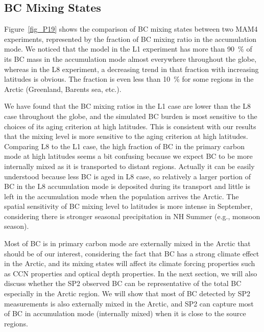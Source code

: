 \documentclass[12pt]{article}
\begin{document}
	\subsection{BC Mixing States}
	 Figure~\ref{fig_P19} shows the comparison of BC mixing states between two MAM4 experiments, represented by the fraction of BC mixing ratio in the accumulation mode. We noticed that the model in the L1 experiment has more than 90~$\%$ of its BC mass in the accumulation mode almost everywhere throughout the globe, whereas in the L8 experiment, a decreasing trend in that fraction with increasing latitudes is obvious. The fraction is even less than 10~$\%$ for some regions in the Arctic (Greenland, Barents sea, etc.). 
	 
	 We have found that the BC mixing ratios in the L1 case are lower than the L8 case throughout the globe, and the simulated BC burden is most sensitive to the choices of its aging criterion at high latitudes. This is consistent with our results that the mixing level is more sensitive to the aging criterion at high latitudes. Comparing L8 to the L1 case, the high fraction of BC in the primary carbon mode at high latitudes seems a bit confusing because we expect BC to be more internally mixed as it is transported to distant regions. Actually it can be easily understood because less BC is aged in L8 case, so relatively a larger portion of BC in the L8 accumulation mode is deposited during its transport and little is left in the accumulation mode when the population arrives the Arctic. The spatial sensitivity of BC mixing level to latitudes is more intense in September, considering there is stronger seasonal precipitation in NH Summer (e.g., monsoon season). 
	 
	 Most of BC is in primary carbon mode are externally mixed in the Arctic that should be of our interest, considering the fact that BC has a strong climate effect in the Arctic, and its mixing states will affect its climate forcing properties such as CCN properties and optical depth properties. In the next section, we will also discuss whether the SP2 observed BC can be representative of the total BC especially in the Arctic region. We will show that most of BC detected by SP2 measurements is also externally mixed in the Arctic, and SP2 can capture most of BC in accumulation mode (internally mixed) when it is close to the source regions.
\end{document}
